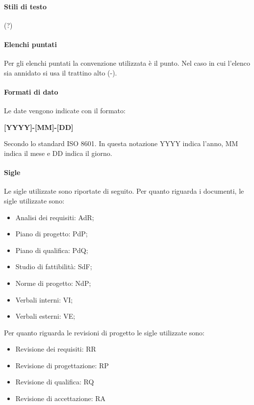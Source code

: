 \documentclass[../norme-di-progetto.tex]{subfiles}
\begin{document}
\paragraph{Stili di testo}
(?)

\paragraph{Elenchi puntati}
Per gli elenchi puntati la convenzione utilizzata è il punto. Nel caso in cui l'elenco sia annidato si usa il trattino alto (-).

\paragraph{Formati di dato}
Le date vengono indicate con il formato:
\begin{center}
    \textbf{[YYYY]-[MM]-[DD]}
\end{center}
Secondo lo standard ISO 8601. In questa notazione YYYY indica l'anno, MM indica il mese e DD indica il giorno.

\paragraph{Sigle}
Le sigle utilizzate sono riportate di seguito.
Per quanto riguarda i documenti, le sigle utilizzate sono:
\begin{itemize}
    \item Analisi dei requisiti: AdR;
    \item Piano di progetto: PdP;
    \item Piano di qualifica: PdQ;
    \item Studio di fattibilità: SdF;
    \item Norme di progetto: NdP;
    \item Verbali interni: VI;
    \item Verbali esterni: VE;
\end{itemize}

Per quanto riguarda le revisioni di progetto le sigle utilizzate sono:
\begin{itemize}
    \item Revisione dei requisiti: RR
    \item Revisione di progettazione: RP
    \item Revisione di qualifica: RQ
    \item Revisione di accettazione: RA
\end{itemize}
\end{document}
